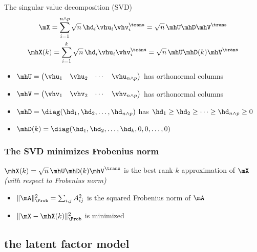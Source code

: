 \documentclass{beamer}
\begin{document}
\begin{frame}{The singular value decomposition (SVD)}
  \begin{gather*}
    \mX = \sum_{i=1}^{n \wedge p} \sqrt{n} \, \hd_i \vhu_i \vhv_i^\trans = \sqrt{n} \, \mhU \mhD \mhV^\trans \\
    \mhX(k) = \sum_{i=1}^k \sqrt{n} \, \hd_i \vhu_i \vhv_i^\trans = \sqrt{n} \, \mhU \mhD(k) \mhV^\trans
  \end{gather*}

  \begin{itemize}
  \item $\mhU = \left(\begin{matrix} \vhu_1 & \vhu_2 & \cdots & \vhu_{n \wedge p} \end{matrix}\right)$ has orthonormal columns
  \item $\mhV = \left(\begin{matrix} \vhv_1 & \vhv_2 & \cdots & \vhv_{n \wedge p} \end{matrix}\right)$ has orthonormal columns
  \item $\mhD = \diag(\hd_1, \hd_2, \ldots, \hd_{n \wedge p})$ has 
    $\hd_1 \geq \hd_2 \geq \cdots \geq \hd_{n \wedge p} \geq 0$
  \item $\mhD(k) = \diag(\hd_1, \hd_2, \ldots, \hd_k, 0, 0, \ldots, 0)$ 
  \end{itemize}
\end{frame}

\begin{frame}
\frametitle{The SVD minimizes Frobenius norm}
  $\mhX(k) = \sqrt{n} \, \mhU \mhD(k) \mhV^\trans$ is the best rank-$k$ approximation of $\mX$ \\
  {\small \textit{(with respect to Frobenius norm)}}

  \begin{itemize}
  \item $\| \mA \|_\Frob^2 = \sum_{i,j} A_{ij}^2$ is the squared Frobenius norm of $\mA$
  \item $\| \mX - \mhX(k) \|_\Frob^2$ is minimized
  \end{itemize}
\end{frame}

\subsection{the latent factor model}
\end{document}
